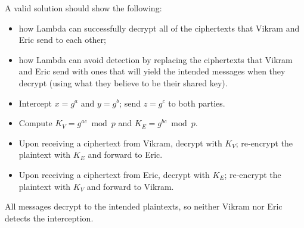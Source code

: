 \documentclass[11pt,addpoints,answers]{exam}
\begin{document}
\begin{questions}
\begin{parts}
      A valid solution should show the following:
      \begin{itemize}
      \item how Lambda can successfully decrypt all of the ciphertexts that Vikram and Eric send to each other;
      \item how Lambda can avoid detection by replacing the ciphertexts that Vikram and Eric send with ones that will yield the intended messages when they decrypt (using what they believe to be their shared key).
      \end{itemize}

      \begin{solution}
      \begin{itemize}
      \item Intercept \(x=g^{a}\) and \(y=g^{b}\); send \(z=g^{c}\) to both parties.
      \item Compute \(K_V=g^{ac}\bmod p\) and \(K_E=g^{bc}\bmod p\).
      \item Upon receiving a ciphertext from Vikram, decrypt with \(K_V\); re‑encrypt the plaintext with \(K_E\) and forward to Eric.
      \item Upon receiving a ciphertext from Eric, decrypt with \(K_E\); re‑encrypt the plaintext with \(K_V\) and forward to Vikram.
      \end{itemize}
      All messages decrypt to the intended plaintexts, so neither Vikram nor Eric detects the interception.
      \end{solution}
  \end{parts}


\end{questions}
\end{document}
